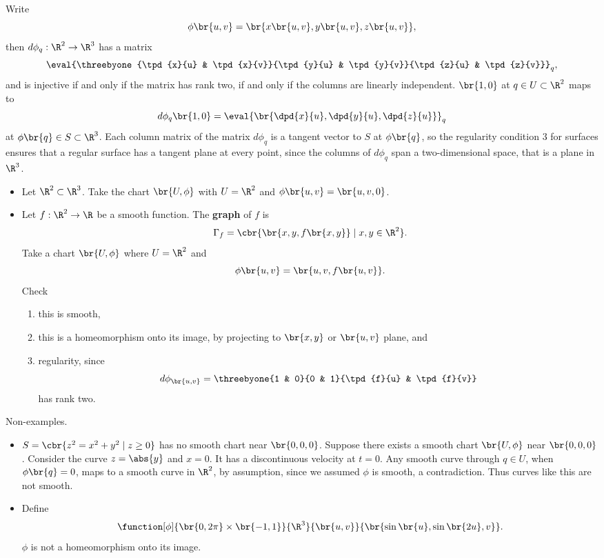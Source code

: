 Write
$$ \phi\br{u, v} = \br{x\br{u, v}, y\br{u, v}, z\br{u, v}}, $$
then $ d\phi_q : \R^2 \to \R^3 $ has a matrix
$$ \eval{\threebyone{\tpd{x}{u} & \tpd{x}{v}}{\tpd{y}{u} & \tpd{y}{v}}{\tpd{z}{u} & \tpd{z}{v}}}_q, $$
and is injective if and only if the matrix has rank two, if and only if the columns are linearly independent. $ \br{1, 0} $ at $ q \in U \subset \R^2 $ maps to
$$ d\phi_q\br{1, 0} = \eval{\br{\dpd{x}{u}, \dpd{y}{u}, \dpd{z}{u}}}_q $$
at $ \phi\br{q} \in S \subset \R^3 $. Each column matrix of the matrix $ d\phi_q $ is a tangent vector to $ S $ at $ \phi\br{q} $, so the regularity condition $ 3 $ for surfaces ensures that a regular surface has a tangent plane at every point, since the columns of $ d\phi_q $ span a two-dimensional space, that is a plane in $ \R^3 $.

\begin{example*}
\hfill
\begin{itemize}
\item Let $ \R^2 \subset \R^3 $. Take the chart $ \br{U, \phi} $ with $ U = \R^2 $ and $ \phi\br{u, v} = \br{u, v, 0} $.
\item Let $ f : \R^2 \to \R $ be a smooth function. The \textbf{graph} of $ f $ is
$$ \Gamma_f = \cbr{\br{x, y, f\br{x, y}} \mid x, y \in \R^2}. $$
Take a chart $ \br{U, \phi} $ where $ U = \R^2 $ and
$$ \phi\br{u, v} = \br{u, v, f\br{u, v}}. $$
Check
\begin{enumerate}
\item this is smooth,
\item this is a homeomorphism onto its image, by projecting to $ \br{x, y} $ or $ \br{u, v} $ plane, and
\item regularity, since
$$ d\phi_{\br{u, v}} = \threebyone{1 & 0}{0 & 1}{\tpd{f}{u} & \tpd{f}{v}} $$
has rank two.
\end{enumerate}
\end{itemize}
\end{example*}

\pagebreak

\begin{example*}
Non-examples.
\begin{itemize}
\item $ S = \cbr{z^2 = x^2 + y^2 \mid z \ge 0} $ has no smooth chart near $ \br{0, 0, 0} $. Suppose there exists a smooth chart $ \br{U, \phi} $ near $ \br{0, 0, 0} $. Consider the curve $ z = \abs{y} $ and $ x = 0 $. It has a discontinuous velocity at $ t = 0 $. Any smooth curve through $ q \in U $, when $ \phi\br{q} = 0 $, maps to a smooth curve in $ \R^2 $, by assumption, since we assumed $ \phi $ is smooth, a contradiction. Thus curves like this are not smooth.
\item Define
$$ \function[\phi]{\br{0, 2\pi} \times \br{-1, 1}}{\R^3}{\br{u, v}}{\br{\sin\br{u}, \sin\br{2u}, v}}. $$
$ \phi $ is not a homeomorphism onto its image.
\end{itemize}
\end{example*}

